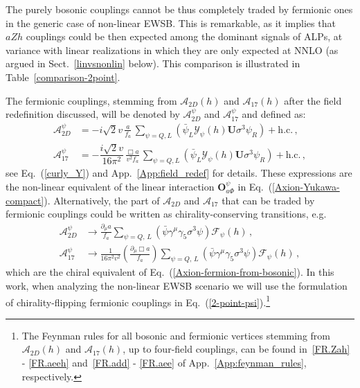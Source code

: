 \documentclass[11pt]{article}
\newcommand{\g}{\gamma}
\newcommand{\A}{\mathcal{A}}
\newcommand{\F}{\mathcal{F}}
\renewcommand{\O}{\mathbf{O}}
\newcommand{\U}{\mathbf{U}}
\newcommand{\de}{\partial}
\newcommand{\hc}{\mathrm{h.c.}}
\newcommand{\beq}{\begin{equation}}
\newcommand{\eeq}{\end{equation}}
\renewcommand{\[}{\begin{equation}}
\renewcommand{\]}{\end{equation}}
\begin{document}
The purely bosonic couplings cannot be thus completely traded by fermionic ones in the generic case of non-linear EWSB.  
This is remarkable, as it implies that $aZh$ couplings could be then expected among the dominant signals of ALPs, at variance with 
linear realizations in which they are only expected at NNLO (as argued in Sect.~\ref{linvsnonlin} below). This comparison is illustrated in Table~\ref{comparison-2point}.  


The fermionic couplings, 
stemming from  $\A_{2D}(h)$ and $\A_{17}(h)$ after the field redefinition discussed,    
 will be denoted by $\A^\psi_{2D}$ and $\A^\psi_{17}$ and defined as: 
\beq
\begin{aligned}
\A^\psi_{2D}&=-i\sqrt{2}v \, \frac{a}{f_a}\,\sum_{\psi=Q,L}\left(\bar\psi_{L}\mathcal{Y}_\psi(h) \U \sigma^3 \psi_{R}\right) +\hc\,,\\
\A^\psi_{17}&=-\dfrac{i\sqrt{2}v}{16\pi^2}\, \frac{\Box a}{v^2 f_a}\,\sum_{\psi=Q,L}\left(\bar\psi_{L}\mathcal{Y}_\psi(h) \U \sigma^3 \psi_{R}\right)+\hc\,,
\end{aligned}
\label{2-point-psi}
\eeq
see Eq.~(\ref{curly_Y}) and App.~\ref{App:field_redef} for details. These expressions   
are the non-linear equivalent of the linear interaction $\O_{a \Phi}^\psi$ in Eq.~(\ref{Axion-Yukawa-compact}).  
 Alternatively, the part of $\A_{2D}$ and $\A_{17}$ that can be traded by fermionic couplings could be written as chirality-conserving transitions, e.g.
\begin{equation}
\begin{aligned}
 \A^\psi_{2D} &\rightarrow  \frac{\de_\mu a}{f_a}\sum_{ \psi=Q,\,L}\left(\bar\psi \g^\mu\g_5\sigma^3 \psi\right)\F_\psi(h)\,,\\
\A^\psi_{17} &\rightarrow \frac{1}{16\pi^2 v^2}\left(\frac{\de_\mu \Box a}{ f_a}\right)\sum_{ \psi=Q,\,L} \left(\bar\psi \g^\mu\g_5\sigma^3 \psi\right)\F_\psi(h)\,, 
\end{aligned}
\label{Apsi_2D_da}
\end{equation} 
 which are the chiral equivalent of Eq.~(\ref{Axion-fermion-from-bosonic}).  In this work, when analyzing the non-linear EWSB scenario we will use the 
 formulation of chirality-flipping fermionic couplings in Eq.~(\ref{2-point-psi}).\footnote{The Feynman rules for all bosonic and fermionic vertices 
 stemming from $\A_{2D}(h)$ and $\A_{17}(h)$, up to four-field couplings, can be found in~\ref{FR.Zah} - \ref{FR.aeeh} and~\ref{FR.add} - \ref{FR.aee} 
 of App.~\ref{App:feynman_rules}, respectively.}
\end{document}
